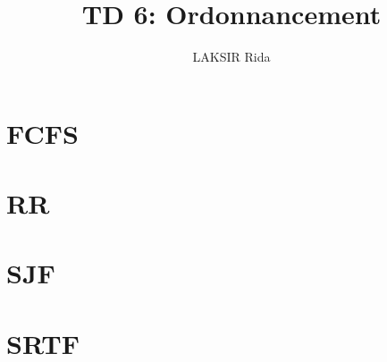 \documentclass{article}
\author{LAKSIR Rida}
\title{TD 6: Ordonnancement}
\begin{document}
\maketitle

\section{FCFS}



\section{RR}



\section{SJF}



\section{SRTF}


\end{document}
